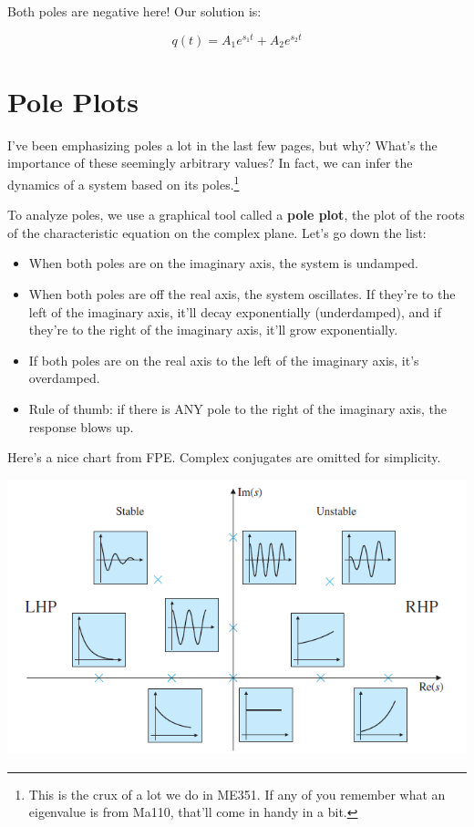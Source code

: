 \documentclass{report}
\begin{document}
\begin{onehalfspacing}
\begin{flushleft}
Both poles are negative here! Our solution is:

\vspace{-0.1in}
\[q(t) = A_1 e^{s_1 t} + A_2 e^{s_2 t}\]

\section{Pole Plots}

I've been emphasizing poles a lot in the last few pages, but why? What's the importance of these seemingly arbitrary values? In fact, we can infer the dynamics of a system based on its poles.\footnote{This is the crux of a lot we do in ME351. If any of you remember what an eigenvalue is from Ma110, that'll come in handy in a bit.}

\medskip

To analyze poles, we use a graphical tool called a \textbf{pole plot}, the plot of the roots of the characteristic equation on the complex plane. Let's go down the list:

\begin{itemize}[noitemsep]
    \item When both poles are on the imaginary axis, the system is undamped.
    \item When both poles are off the real axis, the system oscillates. If they're to the left of the imaginary axis, it'll decay exponentially (underdamped), and if they're to the right of the imaginary axis, it'll grow exponentially.
    \item If both poles are on the real axis to the left of the imaginary axis, it's overdamped.
    \item Rule of thumb: if there is ANY pole to the right of the imaginary axis, the response blows up.
\end{itemize}

Here's a nice chart from FPE. Complex conjugates are omitted for simplicity.

\begin{center}
    {\includegraphics[height=8cm]{7_fpe}}
\end{center}


\end{flushleft}
\end{onehalfspacing}
\end{document}
